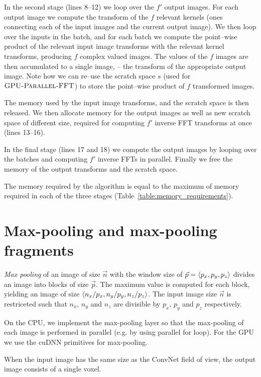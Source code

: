 \documentclass[conference]{./IEEEtran/IEEEtran}
\DeclarePairedDelimiter{\angled}{\langle}{\rangle}
\begin{document}
  In the second stage (lines 8--12) we loop over the $f'$ output
  images.  For each output image we compute the transform
  of the $f$ relevant kernels (ones connecting each of the input
  images and the current output image).  We then loop
  over the inputs in the batch, and for each batch we compute the
  point--wise product of the relevant input image transforms with the
  relevant kernel transforms, producing $f$ complex valued images.
  The values of the $f$ images are then accumulated to a single image,
  -- the transform of the appropriate output image.  Note how we can
  re--use the scratch space $s$ (used for $\textnormal{\scshape GPU-Parallel-FFT}$)
  to store the point--wise product of $f$ transformed images.

  The memory used by the input image transforms, and the scratch space
  is then released.  We then allocate memory for the output images as
  well as new scratch space of different size, required for computing
  $f'$ inverse FFT transforms at once (lines 13--16).

  In the final stage (lines 17 and 18) we compute the output images by
  looping over the batches and computing $f'$ inverse FFTs in
  parallel.  Finally we free the memory of the output transforms and
  the scratch space.

  The memory required by the algorithm is equal to the maximum of
  memory required in each of the three stages
  (Table~\ref{table:memory_requirements}).

\section{Max-pooling and max-pooling fragments}

  \emph{Max pooling} of an image of size $\vec{n}$ with the window
  size of $\vec{p} = \angled{p_x,p_y,p_z}$ divides an image into
  blocks of size $\vec{p}$.  The maximum value is computed for each
  block, yielding an image of size $\angled{n_x/p_x,n_y/p_y,n_z/p_z}$.
  The input image size $\vec{n}$ is restriceted such that $n_x$, $n_y$
  and $n_z$ are divisible by $p_x$, $p_y$ and $p_z$ respectively.

  On the CPU, we implement the max-pooling layer so that the
  max-pooling of each image is performed in parallel (e.g. by using
  parallel for loop).  For the GPU we use the cuDNN primitives for
  max-pooling.

  When the input image has the same size as the ConvNet field of view,
  the output image consists of a single voxel.
\end{document}
